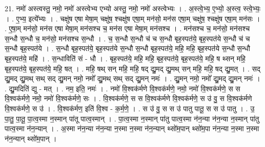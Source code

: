 \documentclass[17pt]{extarticle}
\begin{document}
21. नमो॑ अस्त्वस्तु॒ नमो॒ नमो॑ अस्त्वेभ्य एभ्यो अस्तु॒ नमो॒ नमो॑ अस्त्वेभ्यः । . अ॒स्त्वे॒भ्य॒ ए॒भ्यो॒ अ॒स्त्व॒ स्त्वे॒भ्यः॒ । . ए॒भ्य॒ इत्ये᳚भ्यः । . चक्षु॑ष एषा मेषा॒म् चक्षु॑ष॒ श्चक्षु॑ष एषा॒म् मन॑सो॒ मन॑स एषा॒म् चक्षु॑ष॒ श्चक्षु॑ष एषा॒म् मन॑सः । . ए॒षा॒म् मन॑सो॒ मन॑स एषा मेषा॒म् मन॑सश्च च॒ मन॑स एषा मेषा॒म् मन॑सश्च । . मन॑सश्च च॒ मन॑सो॒ मन॑सश्च स॒न्धौ स॒न्धौ च॒ मन॑सो॒ मन॑सश्च स॒न्धौ । . च॒ स॒न्धौ स॒न्धौ च॑ च स॒न्धौ बृह॒स्पत॑ये॒ बृह॒स्पत॑ये स॒न्धौ च॑ च स॒न्धौ बृह॒स्पत॑ये । . स॒न्धौ बृह॒स्पत॑ये॒ बृह॒स्पत॑ये स॒न्धौ स॒न्धौ बृह॒स्पत॑ये॒ महि॒ महि॒ बृह॒स्पत॑ये स॒न्धौ स॒न्धौ बृह॒स्पत॑ये॒ महि॑ । . स॒न्धाविति॑ सं - धौ । . बृह॒स्पत॑ये॒ महि॒ महि॒ बृह॒स्पत॑ये॒ बृह॒स्पत॑ये॒ महि॒ ष थ्सन् महि॒ बृह॒स्पत॑ये॒ बृह॒स्पत॑ये॒ महि॒ षत् । . महि॒ षथ् सन् महि॒ महि॒ षद् द्यु॒मद् द्यु॒मथ् सन् महि॒ महि॒ षद् द्यु॒मत् । . सद् द्यु॒मद् द्यु॒मथ् सथ् सद् द्यु॒मन् नमो॒ नमो᳚ द्यु॒मथ् सथ् सद् द्यु॒मन् नमः॑ । . द्यु॒मन् नमो॒ नमो᳚ द्यु॒मद् द्यु॒मन् नमः॑ । . द्यु॒मदिति॑ द्यु - मत् । . नम॒ इति॒ नमः॑ । . नमो॑ वि॒श्वक॑र्मणे वि॒श्वक॑र्मणे॒ नमो॒ नमो॑ वि॒श्वक॑र्मणे॒ स स वि॒श्वक॑र्मणे॒ नमो॒ नमो॑ वि॒श्वक॑र्मणे॒ सः । . वि॒श्वक॑र्मणे॒ स स वि॒श्वक॑र्मणे वि॒श्वक॑र्मणे॒ स उ॑ वु॒ स वि॒श्वक॑र्मणे वि॒श्वक॑र्मणे॒ स उ॑ । . वि॒श्वक॑र्मण॒ इति॑ वि॒श्व - क॒र्म॒णे॒ । . स उ॑ वु॒ स स उ॑ पातु पातू॒ स स उ॑ पातु । . उ॒ पा॒तु॒ पा॒तू॒ पा॒त्व॒स्मा न॒स्मान् पा॑तू पात्व॒स्मान् । . पा॒त्व॒स्मा न॒स्मान् पा॑तु पात्व॒स्मा न॑न॒न्या न॑न॒न्या न॒स्मान् पा॑तु पात्व॒स्मा न॑न॒न्यान् । . अ॒स्मा न॑न॒न्या न॑न॒न्या न॒स्मा न॒स्मा न॑न॒न्यान् थ्सो॑म॒पान् थ्सो॑म॒पा न॑न॒न्या न॒स्मा न॒स्मा न॑न॒न्यान् थ्सो॑म॒पान् । \newline
\end{document}
